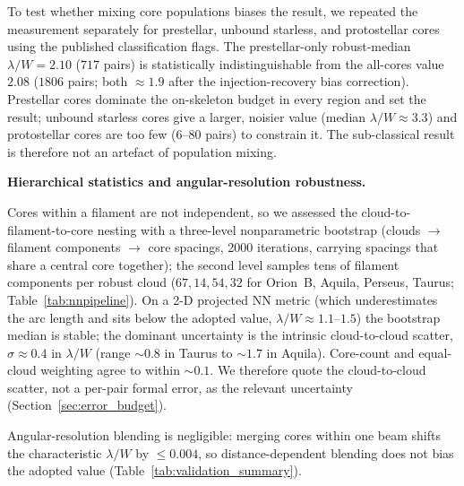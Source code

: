 \documentclass[usenatbib,twoside,twocolumn]{mnras}
\begin{document}
To test whether mixing core populations biases the result, we repeated the measurement separately for prestellar, unbound starless, and protostellar cores using the published classification flags. The prestellar-only robust-median $\lambda/W=2.10$ ($717$ pairs) is statistically indistinguishable from the all-cores value $2.08$ ($1806$ pairs; both $\approx1.9$ after the injection-recovery bias correction). Prestellar cores dominate the on-skeleton budget in every region and set the result; unbound starless cores give a larger, noisier value (median $\lambda/W\approx3.3$) and protostellar cores are too few ($6$--$80$ pairs) to constrain it. The sub-classical result is therefore not an artefact of population mixing.

\smallskip\noindent\textbf{Hierarchical statistics and angular-resolution robustness.}

Cores within a filament are not independent, so we assessed the cloud-to-filament-to-core nesting with a three-level nonparametric bootstrap (clouds $\to$ filament components $\to$ core spacings, 2000 iterations, carrying spacings that share a central core together); the second level samples tens of filament components per robust cloud ($67,14,54,32$ for Orion~B, Aquila, Perseus, Taurus; Table~\ref{tab:nnpipeline}). On a 2-D projected NN metric (which underestimates the arc length and sits below the adopted value, $\lambda/W\approx1.1$--$1.5$) the bootstrap median is stable; the dominant uncertainty is the intrinsic cloud-to-cloud scatter, $\sigma\approx0.4$ in $\lambda/W$ (range $\sim0.8$ in Taurus to $\sim1.7$ in Aquila). Core-count and equal-cloud weighting agree to within $\sim0.1$. We therefore quote the cloud-to-cloud scatter, not a per-pair formal error, as the relevant uncertainty (Section~\ref{sec:error_budget}).

Angular-resolution blending is negligible: merging cores within one beam shifts the characteristic $\lambda/W$ by $\le0.004$, so distance-dependent blending does not bias the adopted value (Table~\ref{tab:validation_summary}).
\end{document}
